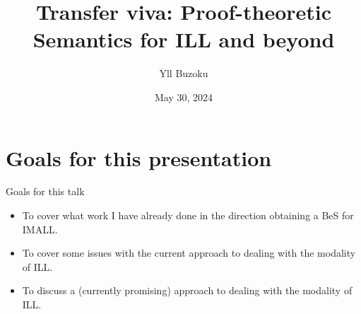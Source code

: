 \documentclass{beamer}
\title[P-tS for ILL]{Transfer viva: \newline Proof-theoretic Semantics for ILL and beyond}
\author{Yll Buzoku}
\institute[UCL]{%
  Department of Computer Science \\ %
  University College London
}
\date{May 30, 2024}
\begin{document}
\begin{frame}
\titlepage
\end{frame}
\section*{Goals for this presentation}
\begin{frame}{Goals for this talk}
\begin{itemize}
\item To cover what work I have already done in the direction obtaining a BeS for IMALL.
\item To cover some issues with the current approach to dealing with the modality of ILL.
\item To discuss a (currently promising) approach to dealing with the modality of ILL.
\end{itemize}
\end{frame}
\end{document}
